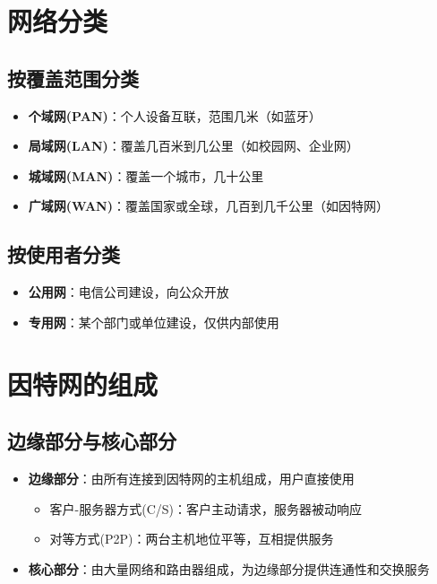 \section{网络分类}
\subsection{按覆盖范围分类}
\begin{itemize}[leftmargin=2em,itemsep=0pt]
    \item \textbf{个域网(PAN)}：个人设备互联，范围几米（如蓝牙）
    \item \textbf{局域网(LAN)}：覆盖几百米到几公里（如校园网、企业网）
    \item \textbf{城域网(MAN)}：覆盖一个城市，几十公里
    \item \textbf{广域网(WAN)}：覆盖国家或全球，几百到几千公里（如因特网）
\end{itemize}

\subsection{按使用者分类}
\begin{itemize}[leftmargin=2em,itemsep=0pt]
    \item \textbf{公用网}：电信公司建设，向公众开放
    \item \textbf{专用网}：某个部门或单位建设，仅供内部使用
\end{itemize}

\section{因特网的组成}
\subsection{边缘部分与核心部分}
\begin{itemize}[leftmargin=2em,itemsep=0pt]
    \item \textbf{边缘部分}：由所有连接到因特网的主机组成，用户直接使用
    \begin{itemize}[itemsep=0pt]
        \item 客户-服务器方式(C/S)：客户主动请求，服务器被动响应
        \item 对等方式(P2P)：两台主机地位平等，互相提供服务
    \end{itemize}
    \item \textbf{核心部分}：由大量网络和路由器组成，为边缘部分提供连通性和交换服务
\end{itemize}


